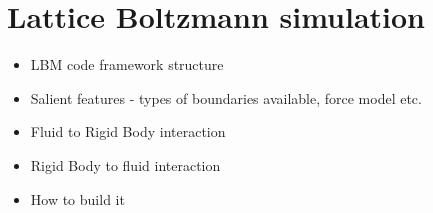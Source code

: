 \section{Lattice Boltzmann simulation}

\begin{itemize}
	\item LBM code framework structure
	\item Salient features - types of boundaries available, force model etc.
	\item Fluid to Rigid Body interaction
	\item Rigid Body to fluid interaction
	\item How to build it
\end{itemize}